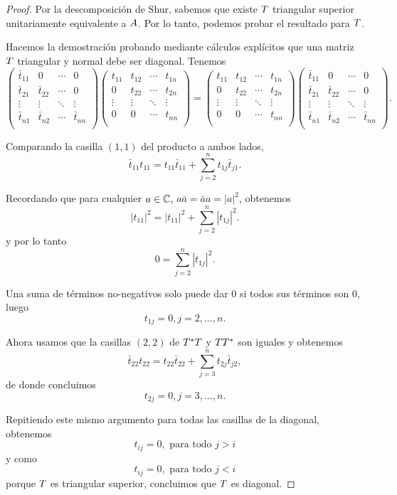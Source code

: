 \begin{proof}
Por la descomposición de Shur, sabemos que existe $\Tb$ triangular superior unitariamente equivalente a $\Ab$.
Por lo tanto, podemos probar el resultado para $\Tb$.

Hacemos la demostración probando mediante cálculos explícitos que una matriz $\Tb$ triangular y normal debe ser diagonal. Tenemos
$$
\begin{pmatrix}
\bar t_{11} & 0           & \cdots & 0 \\
\bar t_{21} & \bar t_{22} & \cdots & 0\\
\vdots      & \vdots      & \ddots & \vdots \\
\bar t_{n1} & \bar t_{n2} & \cdots & \bar t_{nn}\\
\end{pmatrix}
\begin{pmatrix}
t_{11} & t_{12} & \cdots & t_{1n} \\
0      & t_{22} & \cdots & t_{2n} \\
\vdots & \vdots & \ddots & \vdots \\
0      & 0      & \cdots & t_{nn}\\
\end{pmatrix} =
\begin{pmatrix}
t_{11} & t_{12} & \cdots & t_{1n} \\
0      & t_{22} & \cdots & t_{2n} \\
\vdots & \vdots & \ddots & \vdots \\
0      & 0      & \cdots & t_{nn}\\
\end{pmatrix} \begin{pmatrix}
\bar t_{11} & 0           & \cdots & 0 \\
\bar t_{21} & \bar t_{22} & \cdots & 0\\
\vdots      & \vdots      & \ddots & \vdots \\
\bar t_{n1} & \bar t_{n2} & \cdots & \bar t_{nn}\\
\end{pmatrix}.
$$

Comparando la casilla $(1,1)$ del producto a ambos lados,
$$
\bar t_{11} t_{11} = t_{11} \bar t_{11} + \sum_{j = 2}^n t_{1j} \bar t_{j1}.
$$

Recordando que para cualquier $a \in \mathbb C$, $a \bar a = \bar a a = |a|^2$, obtenemos
$$
|t_{11}|^2 = |t_{11}|^2  + \sum_{j = 2}^n |t_{1j}|^2.
$$
y por lo tanto
$$
0 = \sum_{j = 2}^n |t_{1j}|^2.
$$

Una suma de términos no-negativos solo puede dar 0 si todos sus términos son 0, luego
$$
t_{1j} = 0, j = 2, \dots, n.
$$

Ahora usamos que la casillas $(2,2)$ de $\Tb^* \Tb$ y $\Tb \Tb^*$ son iguales y obtenemos
$$
\bar t_{22} t_{22} = t_{22} \bar t_{22} + \sum_{j = 3}^n t_{2j} \bar t_{j2},
$$
de donde concluimos
$$
t_{2j} = 0, j = 3, \dots, n.
$$

Repitiendo este mismo argumento para todas las casillas de la diagonal, obtenemos
$$
t_{ij} = 0, \text{ para todo } j > i
$$
y como
$$
t_{ij} = 0, \text{ para todo } j < i
$$
porque $\Tb$ es triangular superior, concluimos que $\Tb$ es diagonal.
\end{proof}
